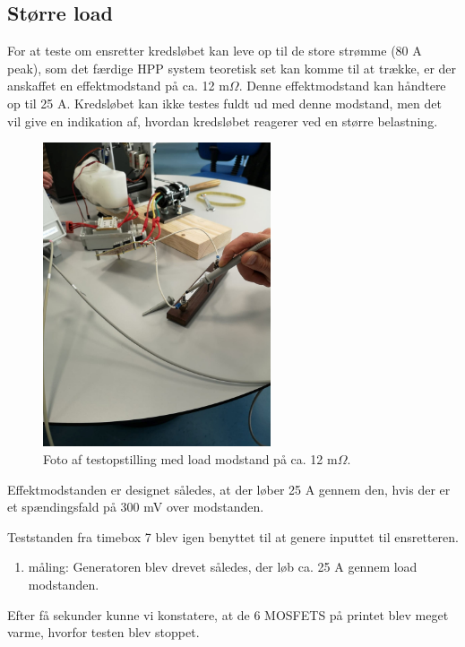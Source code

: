 \subsection{Større load}
\label{sec:storre-load}

For at teste om ensretter kredsløbet kan leve op til de store strømme (80 A peak), som det færdige HPP system teoretisk set kan komme til at trække, er der anskaffet en effektmodstand på ca. 12 m$\Omega$. Denne effektmodstand kan håndtere op til 25 A. Kredsløbet kan ikke testes fuldt ud med denne modstand, men det vil give en indikation af, hvordan kredsløbet reagerer ved en større belastning.
\clearpage
\begin{figure}[h]
  \centering
  \includegraphics[width=0.6\textwidth]{tbil4.jpg}
  \caption{Foto af testopstilling med load modstand på ca. 12 m$\Omega$.}
  \label{fig:tbil4}
\end{figure}

Effektmodstanden er designet således, at der løber 25 A gennem den, hvis der er et spændingsfald på 300 mV over modstanden.  

Teststanden fra timebox 7 blev igen benyttet til at genere inputtet til ensretteren.

\begin{enumerate}
\item måling: Generatoren blev drevet således, der løb ca. 25 A gennem load modstanden.
\end{enumerate}
Efter få sekunder kunne vi konstatere, at de 6 MOSFETS på printet blev meget varme, hvorfor testen blev stoppet. 


